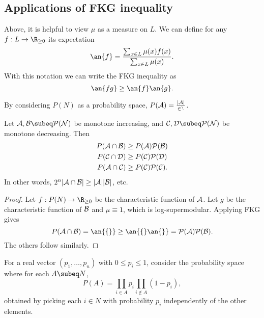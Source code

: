 
\subsection{Applications of FKG inequality}
Above, it is helpful to view $\mu$ as a measure on $L$. We can define for any $f:L\to \R_{\ge0}$ its expectation
\[
\an{f}=\frac{\sum_{x\in L}\mu(x)f(x)}{\sum_{x\in L}\mu(x)}.
\]
With this notation we can write the FKG inequality as
\[
\an{fg}\ge \an{f}\an{g}.
\]

By considering $P(N)$ as a probability space, $P(\cal A)=\frac{|\cal A|}{2^n}$.
\begin{lem}
Let $\cal A, \cal B\subeq P(N)$ be monotone increasing, and $\cal C, \cal D\subeq P(N)$ be monotone decreasing. Then
\begin{align*}
P(\cal A\cap \cal B)&\ge P(\cal A)P(\cal B)\\
P(\cal C\cap \cal D)&\ge P(\cal C)P(\cal D)\\
P(\cal A\cap \cal C)&\ge P(\cal C)P(\cal C).
\end{align*}
In other words, $2^n|\cal A\cap \cal B|\ge |\cal A||\cal B|$, etc.
\end{lem}
\begin{proof}
Let $f:P(N)\to \R_{\ge0}$ be the characteristic function of $\cal A$. Let $g$ be the characteristic function of $\cal B$ and $\mu\equiv 1$, which is log-supermodular. Applying FKG gives
\[
P(\cal A\cap \cal B)=\an{fg}\ge \an{f}\an{g}=P(\cal A)P(\cal B).
\]
The others follow similarly.
\end{proof}
For a real vector $(p_1,\ldots, p_n)$ with $0\le p_i\le 1$, consider the probability space where for each $A\subeq N$,
\[
P(A)=\prod_{i\in A}p_i\prod_{i\nin A}(1-p_i),
\]
obtained by picking each $i\in N$ with probability $p_i$ independently of the other elements.

